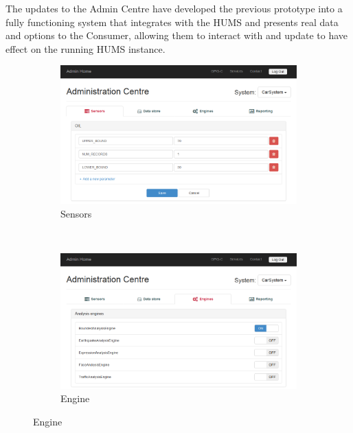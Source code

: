 \documentclass[10pt,a4paper]{article}
\begin{document}
The updates to the Admin Centre have developed the previous prototype into a fully functioning system that integrates with the HUMS and presents real data and options to the Consumer, allowing them to interact with and update to have effect on the running HUMS instance.

\begin{figure}[h!b]
    \begin{subfigure}{0.49\textwidth}
        \includegraphics[width=\textwidth]{images/admin-centre_sensors.png}
        \caption{Sensors}
        \label{fig:admin-centre_sensors}
    \end{subfigure}
    ~
    \begin{subfigure}{0.49\textwidth}
        \includegraphics[width=\textwidth]{images/admin-centre_engines.png}
        \caption{Engine}
        \label{fig:admin-centre_engines}
    \end{subfigure}
	\vspace{0.2cm}


\end{figure}
\end{document}
